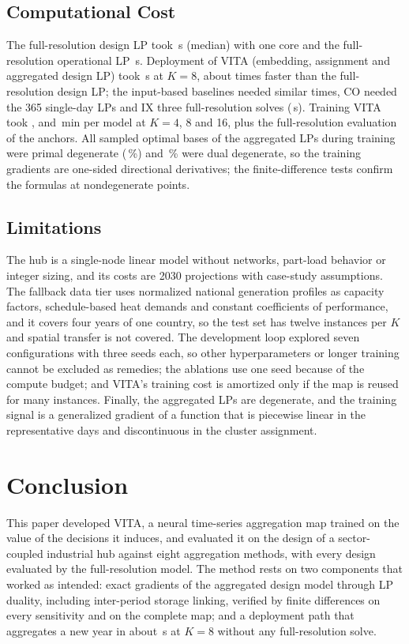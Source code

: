 \documentclass[journal]{IEEEtran}
\begin{document}
\subsection{Computational Cost}
The full-resolution design LP took \OracleTimeMedian\,s (median) with one core and the full-resolution operational LP \FullOperTimeMean\,s. Deployment of VITA (embedding, assignment and aggregated design LP) took \RuntimeVITAKeight\,s at $K=8$, about \SpeedupKeight{} times faster than the full-resolution design LP; the input-based baselines needed similar times, CO needed the 365 single-day LPs and IX three full-resolution solves (\RuntimeIXKeight\,s). Training VITA took \TrainTimeKfour, \TrainTimeKeight{} and \TrainTimeKsixteen\,min per model at $K=4$, 8 and 16, plus the full-resolution evaluation of the anchors. All \DegenSampled{} sampled optimal bases of the aggregated LPs during training were primal degenerate (\DegenPrimalPct\,\%) and \DegenDualPct\,\% were dual degenerate, so the training gradients are one-sided directional derivatives; the finite-difference tests confirm the formulas at nondegenerate points.

\subsection{Limitations}
The hub is a single-node linear model without networks, part-load behavior or integer sizing, and its costs are 2030 projections with case-study assumptions. The fallback data tier uses normalized national generation profiles as capacity factors, schedule-based heat demands and constant coefficients of performance, and it covers four years of one country, so the test set has twelve instances per $K$ and spatial transfer is not covered. The development loop explored seven configurations with three seeds each, so other hyperparameters or longer training cannot be excluded as remedies; the ablations use one seed because of the compute budget; and VITA's training cost is amortized only if the map is reused for many instances. Finally, the aggregated LPs are degenerate, and the training signal is a generalized gradient of a function that is piecewise linear in the representative days and discontinuous in the cluster assignment.

\section{Conclusion}\label{sec:conclusion}
This paper developed VITA, a neural time-series aggregation map trained on the value of the decisions it induces, and evaluated it on the design of a sector-coupled industrial hub against eight aggregation methods, with every design evaluated by the full-resolution model. The method rests on two components that worked as intended: exact gradients of the aggregated design model through LP duality, including inter-period storage linking, verified by finite differences on every sensitivity and on the complete map; and a deployment path that aggregates a new year in about \RuntimeVITAKeight\,s at $K=8$ without any full-resolution solve.
\end{document}
